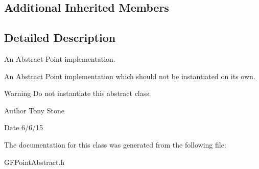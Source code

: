 \subsection*{Additional Inherited Members}


\subsection{Detailed Description}
An Abstract Point implementation. 

An Abstract Point implementation which should not be instantiated on it\textquotesingle{}s own.

\begin{DoxyWarning}{Warning}
Do not instantiate this abstract class.
\end{DoxyWarning}
\begin{DoxyAuthor}{Author}
Tony Stone 
\end{DoxyAuthor}
\begin{DoxyDate}{Date}
6/6/15 
\end{DoxyDate}


The documentation for this class was generated from the following file\+:\begin{DoxyCompactItemize}
\item 
G\+F\+Point\+Abstract.\+h\end{DoxyCompactItemize}
